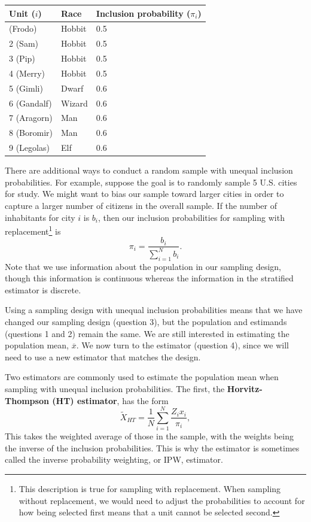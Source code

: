 \documentclass[
  13pt,
  letterpaper,
  DIV=11,
  numbers=noendperiod]{scrreprt}
\newcounter{none} %
\theoremstyle{plain}
\theoremstyle{plain}
\theoremstyle{definition}
\theoremstyle{definition}
\theoremstyle{remark}
\begin{document}
{\def\LTcaptype{none} %
\begin{longtable}[]{@{}lll@{}}
\toprule\noalign{}
Unit (\(i\)) & Race & Inclusion probability (\(\pi_i\)) \\
\midrule\noalign{}
\endhead
\bottomrule\noalign{}
\endlastfoot
1 (Frodo) & Hobbit & 0.5 \\
2 (Sam) & Hobbit & 0.5 \\
3 (Pip) & Hobbit & 0.5 \\
4 (Merry) & Hobbit & 0.5 \\
5 (Gimli) & Dwarf & 0.6 \\
6 (Gandalf) & Wizard & 0.6 \\
7 (Aragorn) & Man & 0.6 \\
8 (Boromir) & Man & 0.6 \\
9 (Legolas) & Elf & 0.6 \\
\end{longtable}
}

There are additional ways to conduct a random sample with unequal
inclusion probabilities. For example, suppose the goal is to randomly
sample 5 U.S. cities for study. We might want to bias our sample toward
larger cities in order to capture a larger number of citizens in the
overall sample. If the number of inhabitants for city \(i\) is \(b_i\),
then our inclusion probabilities for sampling with
replacement\footnote{This description is true for sampling with
  replacement. When sampling without replacement, we would need to
  adjust the probabilities to account for how being selected first means
  that a unit cannot be selected second.} is \[
\pi_i = \frac{b_i}{\sum_{i=1}^N b_i}.
\] Note that we use information about the population in our sampling
design, though this information is continuous whereas the information in
the stratified estimator is discrete.

Using a sampling design with unequal inclusion probabilities means that
we have changed our sampling design (question 3), but the population and
estimands (questions 1 and 2) remain the same. We are still interested
in estimating the population mean, \(\overline{x}\). We now turn to the
estimator (question 4), since we will need to use a new estimator that
matches the design.

Two estimators are commonly used to estimate the population mean when
sampling with unequal inclusion probabilities. The first, the
\textbf{Horvitz-Thompson (HT) estimator}, has the form \[ 
\widetilde{X}_{HT} = \frac{1}{N} \sum_{i=1}^{N} \frac{Z_{i}x_{i}}{\pi_{i}},
\] This takes the weighted average of those in the sample, with the
weights being the inverse of the inclusion probabilities. This is why
the estimator is sometimes called the inverse probability weighting, or
IPW, estimator.
\end{document}
